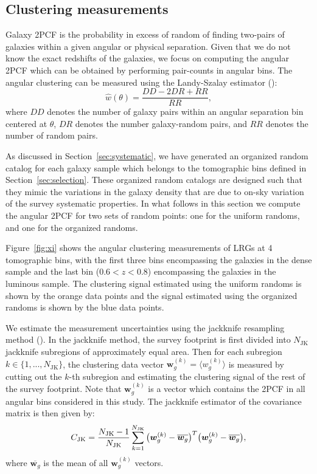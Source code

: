 \documentclass[fleqn,usenatbib,useAMS]{mnras}
\newcommand{\be}{\begin{equation}}
\newcommand{\ee}{\end{equation}}
\newcommand{\dk}{\boldsymbol{w}_{g}^{(k)}}
\newcommand{\dbar}{\overline{\boldsymbol{w}_{g}}}
\newcommand{\njk}{N_{\rm JK}}
\begin{document}
\subsection{Clustering measurements}\label{sec:measurement}

Galaxy 2PCF is the probability in excess of random of finding two-pairs of galaxies within a given angular or physical separation. Given that we do not know the exact redshifts of the galaxies, we focus on computing the angular 2PCF which can be obtained by performing pair-counts in angular bins. The angular clustering can be measured using the Landy-Szalay estimator (\citealt{landy}):
\begin{equation}
    \hat{w}(\theta) = \frac{DD-2DR+RR}{RR},
\label{eq:landy}
\end{equation}
where $DD$ denotes the number of galaxy pairs within an angular separation bin centered at $\theta$, $DR$ denotes the number galaxy-random pairs, and $RR$ denotes the number of random pairs. 

As discussed in Section~\ref{sec:systematic}, we have generated an organized random catalog for each galaxy sample which belongs to the tomographic bins defined in Section~\ref{sec:selection}. These organized random catalogs are designed such that they mimic the variations in the galaxy density that are due to on-sky variation of the survey systematic properties. In what follows in this section we compute the angular 2PCF for two sets of random points: one for the uniform randoms, and one for the organized randoms.

Figure~\ref{fig:xi} shows the angular clustering measurements of LRGs at 4 tomographic bins, with the first three bins encompassing the galaxies in the dense sample and the last bin ($0.6<z<0.8$) encompassing the galaxies in the luminous sample. The clustering signal estimated using the uniform randoms is shown by the orange data points and the signal estimated using the organized randoms is shown by the blue data points. 

We estimate the measurement uncertainties using the jackknife resampling method (\citealt{norberg2009,oliver2016,singh2017,shirasaki2017}). 
In the jackknife method, the survey footprint is first divided into $N_{\mathrm{JK}}$ jackknife subregions of approximately equal area. 
Then for each subregion $k\in\{1,...,N_{\mathrm{JK}}\}$, the clustering data vector $\boldsymbol{w}_{g}^{(k)} = \langle w^{(k)}_{g}\rangle$ is measured by cutting out the $k$-th subregion and estimating the clustering signal of the rest of the survey footprint. Note that $\boldsymbol{w}_{g}^{(k)}$ is a vector which contains the 2PCF in all angular bins considered in this study. The jackknife estimator of the covariance matrix is then given by:
\be 
C_{\rm JK} = \frac{\njk - 1}{\njk}\sum_{k=1}^{\njk}\big(\dk-\dbar\big)^{T}\big(\dk-\dbar\big), 
\label{eq:jk}
\ee
where $\dbar$ is the mean of all $\boldsymbol{w}_{g}^{(k)}$ vectors. 
\end{document}
